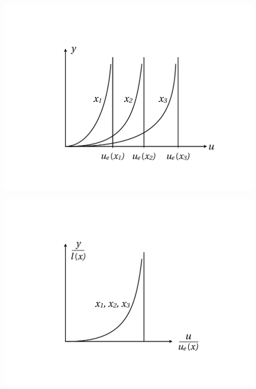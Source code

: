 	\begin{center}
	\begin{minipage}{0.49\textwidth}
\begin{center}
	\includegraphics[scale=0.25]{ch5/11}
\end{center}
	\label{fig:5.11}
	\end{minipage}
	\begin{minipage}{0.49\textwidth}
\begin{center}
	\includegraphics[scale=0.25]{ch5/12}	
\end{center}
	\label{fig:5.12}
	\end{minipage}
	\end{center}
	
